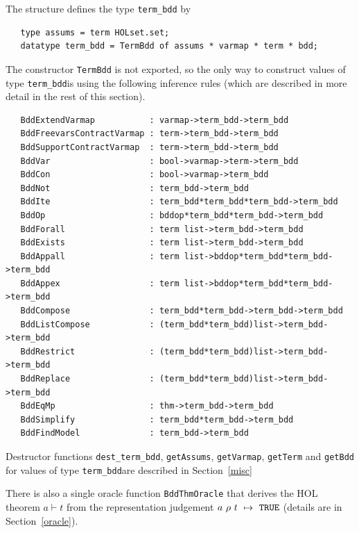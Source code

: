 \documentclass[12pt,fleqn]{book}
\renewcommand{\t}[1]{\mbox{\tt #1}}
\newcommand{\termbdd}[4]{\mbox{$#1~#2~#3~\mapsto~#4$}}
\newcommand\termbddty{\texttt{term\_bdd}{}}
\begin{document}
The structure  defines the type \termbddty{} by

\vspace*{-2mm}

\begin{verbatim}
   type assums = term HOLset.set;
   datatype term_bdd = TermBdd of assums * varmap * term * bdd;
\end{verbatim}

\vspace*{-2mm}

The constructor \t{TermBdd} is not exported, so the only way to construct
values of type \termbddty is using the following inference rules
(which are described in more detail in the rest of this section).

\begin{verbatim}
   BddExtendVarmap           : varmap->term_bdd->term_bdd
   BddFreevarsContractVarmap : term->term_bdd->term_bdd
   BddSupportContractVarmap  : term->term_bdd->term_bdd
   BddVar                    : bool->varmap->term->term_bdd
   BddCon                    : bool->varmap->term_bdd
   BddNot                    : term_bdd->term_bdd
   BddIte                    : term_bdd*term_bdd*term_bdd->term_bdd
   BddOp                     : bddop*term_bdd*term_bdd->term_bdd
   BddForall                 : term list->term_bdd->term_bdd
   BddExists                 : term list->term_bdd->term_bdd
   BddAppall                 : term list->bddop*term_bdd*term_bdd->term_bdd
   BddAppex                  : term list->bddop*term_bdd*term_bdd->term_bdd
   BddCompose                : term_bdd*term_bdd->term_bdd->term_bdd
   BddListCompose            : (term_bdd*term_bdd)list->term_bdd->term_bdd
   BddRestrict               : (term_bdd*term_bdd)list->term_bdd->term_bdd
   BddReplace                : (term_bdd*term_bdd)list->term_bdd->term_bdd
   BddEqMp                   : thm->term_bdd->term_bdd
   BddSimplify               : term_bdd*term_bdd->term_bdd
   BddFindModel              : term_bdd->term_bdd
\end{verbatim}

Destructor functions \t{dest\_term\_bdd}, \t{getAssums}, \t{getVarmap}, \t{getTerm}
and \t{getBdd} for values of type \termbddty are described in Section~\ref{misc}

There is also a single oracle function
\t{BddThmOracle} that derives the HOL theorem $a \vdash t$
from the representation judgement \termbdd{a}{\rho}{t}{\ml{TRUE}}
(details are in Section~\ref{oracle}).
\end{document}
